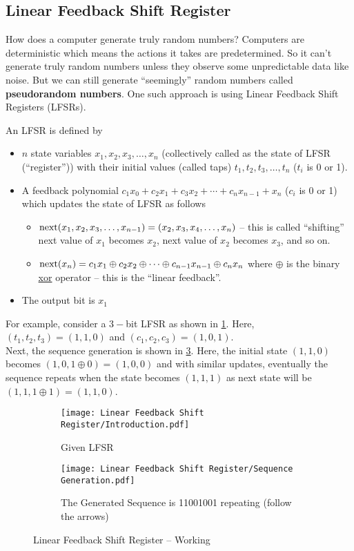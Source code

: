 \subsection{Linear Feedback Shift Register}
How does a computer generate truly random numbers? Computers are deterministic which means the actions it takes are predetermined. So it can’t generate truly random numbers unless they observe some unpredictable data like noise. But we can still generate “seemingly” random numbers called \textbf{pseudorandom numbers}. One such approach is using Linear Feedback Shift Registers (LFSRs).

An LFSR is defined by
\begin{itemize}	
	\item $n$ state variables $x_1, x_2, x_3,\ldots, x_n$ (collectively called as the state of LFSR (``register'')) with their initial values (called taps) $t_1, t_2, t_3,\ldots, t_n$ ($t_i$ is 0 or 1).
	\item A feedback polynomial $c_1x_0 + c_2x_1 + c_3x_2 + \cdots +  c_nx_{n-1} + x_n$ ($c_i$ is 0 or 1) which updates the state of LFSR as follows
	\begin{itemize}
		\item $\operatorname{next}(x_1, x_2, x_3,\ldots, x_{n-1}) = (x_2, x_3, x_4,\ldots, x_n)$ -- this is called ``shifting'' next value of $x_1$ becomes $x_2$, next value of $x_2$ becomes $x_3$, and so on.
		\item $\operatorname{next}(x_n) =  c_1x_1 \oplus c_2x_2 \oplus \cdots \oplus c_{n-1}x_{n-1}\oplus c_nx_n$ where $\oplus$ is the binary \href{https://en.wikipedia.org/wiki/Exclusive_or}{xor} operator -- this is the ``linear feedback''.
	\end{itemize}
	\item The output bit is $x_1$
\end{itemize}
For example, consider a $3-$bit LFSR as shown in \ref{fig:lfsrintro}. Here, $(t_1,t_2,t_3)=(1,1,0)$ and $(c_1,c_2,c_3)=(1,0,1)$.\\
Next, the sequence generation is shown in \ref{fig:lfsrgeneration}. Here, the initial state $(1,1,0)$ becomes $(1,0,1\oplus0) = (1,0,0)$ and with similar updates, eventually the sequence repeats when the state becomes $(1,1,1)$ as next state will be $(1,1,1\oplus1) = (1,1,0)$.
\begin{figure}[H]
	\centering
	\begin{subfigure}[c]{0.4\linewidth}
		\centering
		\texttt{[image: Linear Feedback Shift Register/Introduction.pdf]}
		\caption{Given LFSR}
		\label{fig:lfsrintro}
	\end{subfigure}
	\begin{subfigure}[c]{0.45\linewidth}
		\centering
		\texttt{[image: Linear Feedback Shift Register/Sequence Generation.pdf]}
		\caption{The Generated Sequence is 11001001 repeating (follow the arrows)}
		\label{fig:lfsrgeneration}
	\end{subfigure}
	\caption{Linear Feedback Shift Register -- Working}
\end{figure}
